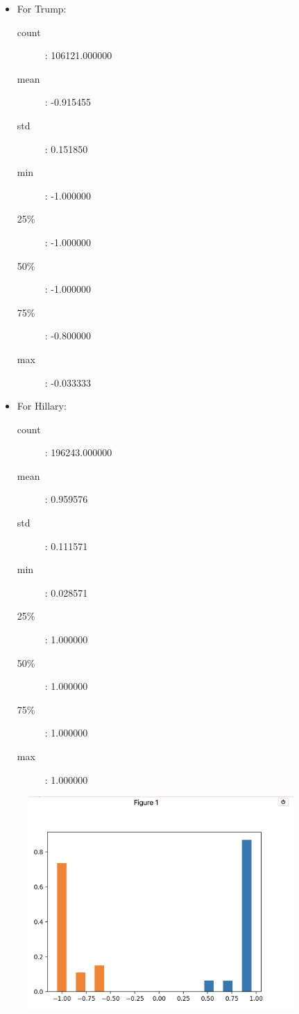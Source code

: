 \documentclass[12pt,a4paper]{report}
\begin{document}
      \begin{itemize}
        \item For Trump:
              \begin{description}
                \item[count]: 106121.000000
                \item[mean]: -0.915455
                \item[std]: 0.151850
                \item[min]: -1.000000
                \item[25\%]: -1.000000
                \item[50\%]: -1.000000
                \item[75\%]: -0.800000
                \item[max]: -0.033333
              \end{description}
        \item For Hillary:
              \begin{description}
                \item[count]: 196243.000000
                \item[mean]: 0.959576
                \item[std]: 0.111571
                \item[min]: 0.028571
                \item[25\%]: 1.000000
                \item[50\%]: 1.000000
                \item[75\%]: 1.000000
                \item[max]: 1.000000
              \end{description}
      \end{itemize}

      \begin{figure}[H]
        \includegraphics[width=0.9\textwidth]{figure.png}
        \centering
      \end{figure}
\end{document}

